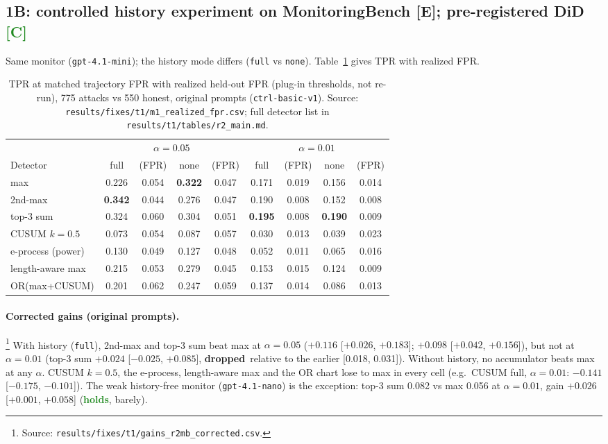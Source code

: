 \documentclass[11pt]{article}
\newcommand{\m}{\ensuremath{-}}
\newcommand{\src}[1]{\footnote{Source: \nolinkurl{#1}.}}
\newcommand{\vhold}{\textcolor{ForestGreen}{\textbf{holds}}}
\newcommand{\vdrop}{\textcolor{BrickRed}{\textbf{dropped}}}
\newcommand{\tC}{\textsf{\scriptsize\textcolor{ForestGreen}{[C]}}\xspace}
\newcommand{\tE}{\textsf{\scriptsize\textcolor{ink2}{[E]}}\xspace}
\begin{document}
\subsection{1B: controlled history experiment on MonitoringBench \tE; pre-registered DiD \tC}

Same monitor (\texttt{gpt-4.1-mini}); the history mode differs (\texttt{full} vs \texttt{none}). Table~\ref{tab:r2} gives TPR with realized FPR.

\begin{table}[!htbp]\centering\small
\begin{adjustbox}{max width=\linewidth}\begin{tabular}{@{}lcccccccc@{}}
\toprule
& \multicolumn{4}{c}{$\alpha=0.05$} & \multicolumn{4}{c}{$\alpha=0.01$}\\
\cmidrule(lr){2-5}\cmidrule(l){6-9}
Detector & full & (FPR) & none & (FPR) & full & (FPR) & none & (FPR)\\
\midrule
max & 0.226 & 0.054 & \textbf{0.322} & 0.047 & 0.171 & 0.019 & 0.156 & 0.014\\
2nd-max & \textbf{0.342} & 0.044 & 0.276 & 0.047 & 0.190 & 0.008 & 0.152 & 0.008\\
top-3 sum & 0.324 & 0.060 & 0.304 & 0.051 & \textbf{0.195} & 0.008 & \textbf{0.190} & 0.009\\
CUSUM $k{=}0.5$ & 0.073 & 0.054 & 0.087 & 0.057 & 0.030 & 0.013 & 0.039 & 0.023\\
e-process (power) & 0.130 & 0.049 & 0.127 & 0.048 & 0.052 & 0.011 & 0.065 & 0.016\\
length-aware max & 0.215 & 0.053 & 0.279 & 0.045 & 0.153 & 0.015 & 0.124 & 0.009\\
OR(max+CUSUM) & 0.201 & 0.062 & 0.247 & 0.059 & 0.137 & 0.014 & 0.086 & 0.013\\
\bottomrule
\end{tabular}\end{adjustbox}
\caption{TPR at matched trajectory FPR with realized held-out FPR (plug-in thresholds, not re-run), 775 attacks vs 550 honest, original prompts (\texttt{ctrl-basic-v1}). Source: \nolinkurl{results/fixes/t1/m1_realized_fpr.csv}; full detector list in \nolinkurl{results/t1/tables/r2_main.md}.}\label{tab:r2}
\end{table}

\paragraph{Corrected gains (original prompts).}\src{results/fixes/t1/gains_r2mb_corrected.csv} With history (\texttt{full}), 2nd-max and top-3 sum beat max at $\alpha=0.05$ ($+0.116$ [$+0.026$, $+0.183$]; $+0.098$ [$+0.042$, $+0.156$]), but not at $\alpha=0.01$ (top-3 sum $+0.024$ [$\m0.025$, $+0.085$], \vdrop\ relative to the earlier [0.018, 0.031]). Without history, no accumulator beats max at any $\alpha$. CUSUM $k{=}0.5$, the e-process, length-aware max and the OR chart lose to max in every cell (e.g.\ CUSUM full, $\alpha=0.01$: $\m0.141$ [$\m0.175$, $\m0.101$]). The weak history-free monitor (\texttt{gpt-4.1-nano}) is the exception: top-3 sum 0.082 vs max 0.056 at $\alpha=0.01$, gain $+0.026$ [$+0.001$, $+0.058$] (\vhold, barely).
\end{document}
